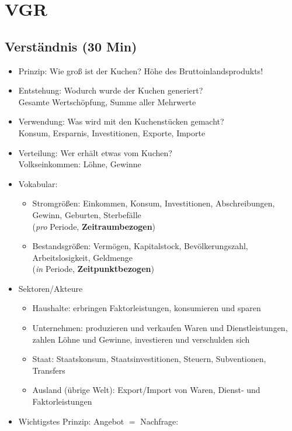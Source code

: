\documentclass{scrartcl}
\begin{document}
\section{VGR}
\subsection{Verst\"{a}ndnis (30 Min)}
\begin{itemize}
\item Prinzip: Wie gro{\ss} ist der Kuchen? H\"{o}he des Bruttoinlandsprodukts!
\item Entstehung: Wodurch wurde der Kuchen generiert?\\ Gesamte Wertsch\"{o}pfung, Summe aller Mehrwerte
\item Verwendung: Was wird mit den Kuchenst\"{u}cken gemacht?\\ Konsum, Ersparnis, Investitionen, Exporte, Importe
\item Verteilung: Wer erh\"{a}lt etwas vom Kuchen?\\ Volkseinkommen: L\"{o}hne, Gewinne
\item Vokabular:
    \begin{itemize}
      \item Stromgr\"{o}{\ss}en: Einkommen, Konsum, Investitionen, Abschreibungen, Gewinn, Geburten, Sterbef\"{a}lle\\ (\emph{pro} Periode, \textbf{Zeitraumbezogen})
      \item Bestandsgr\"{o}{\ss}en: Verm\"{o}gen, Kapitalstock, Bev\"{o}lkerungszahl, Arbeitslosigkeit, Geldmenge\\ (\emph{in} Periode, \textbf{Zeitpunktbezogen})
    \end{itemize}
\item Sektoren/Akteure
    \begin{itemize}
      \item Haushalte: erbringen Faktorleistungen, konsumieren und sparen
      \item Unternehmen: produzieren und verkaufen Waren und Dienstleistungen, zahlen L\"{o}hne und Gewinne, investieren und verschulden sich
      \item Staat: Staatskonsum, Staatsinvestitionen, Steuern, Subventionen, Transfers
      \item Ausland (\"{u}brige Welt): Export/Import von Waren, Dienst- und Faktorleistungen
    \end{itemize}
\item Wichtigstes Prinzip: Angebot $=$ Nachfrage:
    \begin{align*}

\end{align*}
\end{itemize}
\end{document}

